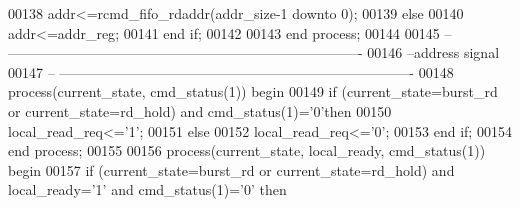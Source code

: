 \begin{DoxyCode}
00138         \textcolor{vhdlchar}{addr}\textcolor{vhdlchar}{<=}\textcolor{vhdlchar}{rcmd_fifo_rdaddr}\textcolor{vhdlchar}{(}\textcolor{vhdlchar}{addr_size}\textcolor{vhdlchar}{-}\textcolor{vhdllogic}{}\textcolor{vhdllogic}{1} \textcolor{keywordflow}{downto} \textcolor{vhdllogic}{}\textcolor{vhdllogic}{0}\textcolor{vhdlchar}{)};
00139     \textcolor{keywordflow}{else}
00140         \textcolor{vhdlchar}{addr}\textcolor{vhdlchar}{<=}\textcolor{vhdlchar}{addr_reg};
00141     \textcolor{keywordflow}{end} \textcolor{keywordflow}{if};
00142 
00143 \textcolor{keywordflow}{end} \textcolor{keywordflow}{process};
00144 
00145 \textcolor{keyword}{-- ----------------------------------------------------------------------------}
00146 \textcolor{keyword}{--address signal}
00147 \textcolor{keyword}{-- ----------------------------------------------------------------------------}
00148 \textcolor{keywordflow}{process}(current_state, cmd_status(\textcolor{vhdllogic}{1})) \textcolor{keywordflow}{begin}
00149         \textcolor{keywordflow}{if} \textcolor{vhdlchar}{(}\textcolor{vhdlchar}{current_state}\textcolor{vhdlchar}{=}\textcolor{vhdlchar}{burst\_rd} \textcolor{keywordflow}{or} \textcolor{vhdlchar}{current_state}\textcolor{vhdlchar}{=}\textcolor{vhdlchar}{rd\_hold}\textcolor{vhdlchar}{)} \textcolor{keywordflow}{and} \textcolor{vhdlchar}{cmd_status}\textcolor{vhdlchar}{(}\textcolor{vhdllogic}{}\textcolor{vhdllogic}{1}\textcolor{vhdlchar}{)}\textcolor{vhdlchar}{=}\textcolor{vhdlchar}{'}\textcolor{vhdllogic}{}\textcolor{vhdllogic}{0}\textcolor{vhdlchar}{'}\textcolor{keywordflow}{then} 
00150             local\_read\_req<='1';
00151         \textcolor{keywordflow}{else} 
00152             local\_read\_req<='0';
00153         \textcolor{keywordflow}{end} \textcolor{keywordflow}{if};
00154 \textcolor{keywordflow}{end} \textcolor{keywordflow}{process};
00155 
00156 \textcolor{keywordflow}{process}(current_state, local_ready, cmd_status(\textcolor{vhdllogic}{1})) \textcolor{keywordflow}{begin}
00157         \textcolor{keywordflow}{if} \textcolor{vhdlchar}{(}\textcolor{vhdlchar}{current_state}\textcolor{vhdlchar}{=}\textcolor{vhdlchar}{burst\_rd} \textcolor{keywordflow}{or} \textcolor{vhdlchar}{current_state}\textcolor{vhdlchar}{=}\textcolor{vhdlchar}{rd\_hold}\textcolor{vhdlchar}{)} \textcolor{keywordflow}{and} \textcolor{vhdlchar}{local_ready}\textcolor{vhdlchar}{=}\textcolor{vhdlchar}{'}\textcolor{vhdllogic}{}\textcolor{vhdllogic}{1}\textcolor{vhdlchar}{'} \textcolor{keywordflow}{and} \textcolor{vhdlchar}{
      cmd_status}\textcolor{vhdlchar}{(}\textcolor{vhdllogic}{}\textcolor{vhdllogic}{1}\textcolor{vhdlchar}{)}\textcolor{vhdlchar}{=}\textcolor{vhdlchar}{'}\textcolor{vhdllogic}{}\textcolor{vhdllogic}{0}\textcolor{vhdlchar}{'} \textcolor{keywordflow}{then} 

\end{DoxyCode}
